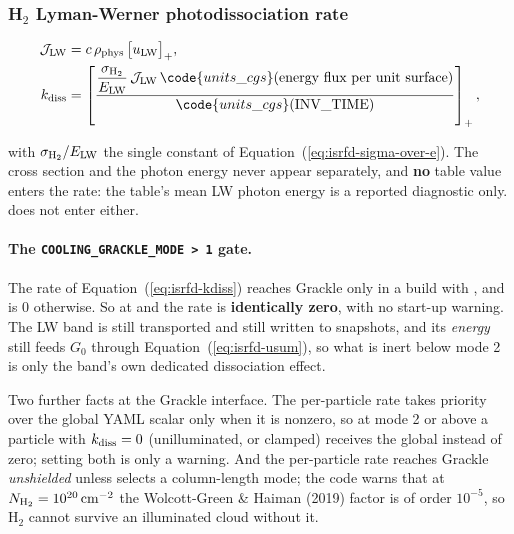 \subsubsection{H$_2$ Lyman-Werner photodissociation rate}

\begin{align}
  \mathcal{J}_{\rm LW} &= c\, \rho_{\rm phys}\, \big[u_{\rm LW}\big]_+,
  \label{eq:isrfd-lw-flux} \\
  k_{\rm diss} &= \left[\frac{\dfrac{\sigma_{\rm H_2}}{E_{\rm LW}}\,
    \mathcal{J}_{\rm LW}\,\code{units\_cgs}(\text{energy flux per unit surface})}
    {\code{units\_cgs}(\mathrm{INV\_TIME})}\right]_+,
  \label{eq:isrfd-kdiss}
\end{align}

with $\sigma_{\rm H_2}/E_{\rm LW}$ the single constant of
Equation~(\ref{eq:isrfd-sigma-over-e}). The cross section and the photon energy
never appear separately, and \textbf{no} table value enters the rate: the table's
mean LW photon energy is a reported diagnostic only.
 does not enter either.

\paragraph{The \texttt{COOLING\_GRACKLE\_MODE > 1} gate.} The rate of
Equation~(\ref{eq:isrfd-kdiss}) reaches Grackle only in a build with
, and is $0$ otherwise. So at
 and  the rate is \textbf{identically zero},
with no start-up warning. The LW band is still transported and still written to
snapshots, and its \emph{energy} still feeds $G_0$ through
Equation~(\ref{eq:isrfd-usum}), so what is inert below mode 2 is only the band's
own dedicated dissociation effect.

Two further facts at the Grackle interface. The per-particle rate takes priority
over the global YAML scalar only when it is nonzero, so at mode 2 or above a
particle with
$k_{\rm diss} = 0$ (unilluminated, or clamped) receives the global
 instead of zero; setting
both is only a warning. And the per-particle rate
reaches Grackle \emph{unshielded} unless
 selects a column-length mode; the code
warns that at $N_{\rm H_2} = 10^{20}\,{\rm cm^{-2}}$ the
Wolcott-Green \& Haiman (2019) factor is of order $10^{-5}$, so H$_2$ cannot survive
an illuminated cloud without it.

